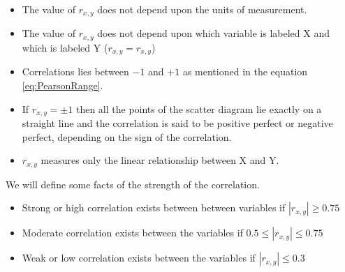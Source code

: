 	\begin{itemize}
		\item The value of \begin{math}r_{x,y}\end{math} does not depend upon the units of measurement.
		\item The value of \begin{math}r_{x,y}\end{math} does not depend upon which variable is labeled X and which is labeled Y (\begin{math}r_{x,y} = r_{x,y}\end{math})
		\item Correlations lies between \begin{math}-1\end{math} and \begin{math}+1\end{math} as mentioned in the equation \ref{eq:PearsonRange}.
		\item If \begin{math}r_{x,y} = \pm 1\end{math} then all the points of the scatter diagram lie exactly on a straight line and the correlation is said to be positive perfect or negative perfect, depending on the sign of the correlation.
		\item \begin{math}r_{x,y}\end{math} measures only the linear relationship between X and Y.
	\end{itemize}



We will define some facts of the strength of the correlation.

	\begin{itemize}
		\item Strong or high correlation exists between between variables if  \begin{math}| r_{x,y} | \geq 0.75\end{math}
		\item Moderate correlation exists between the variables if \begin{math} 0.5 \leq | r_{x,y} | \leq 0.75\end{math}
		\item Weak or low correlation exists between the variables if \begin{math}| r_{x,y} | \leq 0.3\end{math}
	\end{itemize}


